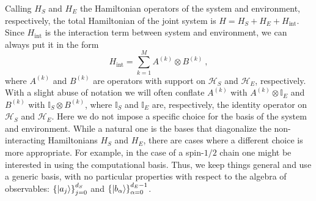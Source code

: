 \documentclass[draft,nofootinbib,pre,twocolumn,showpacs,showkeys,preprintnumbers,floatfix]{revtex4-1}
\newcommand{\1}{\mathbbm{1}}
\begin{document}
Calling $H_S$ and $H_E$ the Hamiltonian operators of the system and environment, respectively, 
the total Hamiltonian of the joint system is $H = H_S + H_E + H_{\mathrm{int}}$. Since $H_{\mathrm{int}}$
is the interaction term between system and environment, we can always put it in the form
\begin{equation}
H_{\mathrm{int}} = \sum_{k=1}^M A^{(k)} \otimes B^{(k)}~,
\end{equation}
where $A^{(k)}$ and $B^{(k)}$ are operators with support on $\mathcal{H}_S$ and $\mathcal{H}_E$,
respectively. With a slight abuse of notation we will often conflate $A^{(k)}$ with $A^{(k)}\otimes \mathbb{I}_E$
and $B^{(k)}$ with $\mathbb{I}_S \otimes B^{(k)}$, where $\mathbb{I}_S$ and $\mathbb{I}_E$ are, respectively,
the identity operator on $\mathcal{H}_{S}$ and $\mathcal{H}_E$.
Here we do not impose a specific choice for the basis of the system and environment. While a natural one
is the bases that diagonalize the non-interacting Hamiltonians $H_S$ and $H_E$, there are cases
where a different choice is more appropriate. For example, in the case of a spin-$1/2$ chain one might be interested 
in using the computational basis. Thus, we keep things general and use a generic basis, with no particular 
properties with respect to the algebra of observables: $\left\{ \ket{a_j}\right\}_{j=0}^{d_S}$ and $\left\{ \ket{b_\alpha}\right\}_{\alpha=0}^{d_E-1}$.
\end{document}
